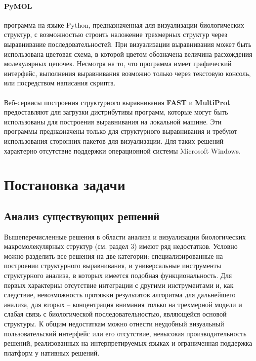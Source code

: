 \documentclass[a4paper, 12pt, titlepage, utf8]{extarticle}
\let\oldsection\section         %
\renewcommand{\section}{\newpage\oldsection}
\begin{document}
\paragraph{PyMOL \cite{pymol}}
программа на языке Python, предназначенная для визуализации биологических структур, с возможностью строить наложение трехмерных структур через выравнивание последовательностей. При визуализации выравнивания может быть использована цветовая схема, в которой цветом обозначена величина расхождения молекулярных цепочек. Несмотря на то, что программа имеет графический интерфейс, выполнения выравнивания возможно только через текстовую консоль, или посредством написания скрипта.
 
\paragraph{}
Веб-сервисы построения структурного выравнивания \textbf{FAST} и \textbf{MultiProt} предоставляют для загрузки дистрибутивы программ, которые могут быть использованы для построения выравнивания на локальной машине. Эти программы предназначены только для структурного выравнивания и требуют использования сторонних пакетов для визуализации. Для таких решений характерно отсутствие поддержки операционной системы Microsoft Windows.


\section{Постановка задачи}	%

\subsection{Анализ существующих решений}
Вышеперечисленные решения в области анализа и визуализации биологических макромолекулярных структур (см. раздел 3) имеют ряд недостатков. Условно можно разделить все решения на две категории: специализированные на построении структурного выравнивания, и универсальные инструменты структурного анализа, в которых имеется подобная функциональность. Для первых характерны отсутствие интеграции с другими инструментами и, как следствие, невозможность протяжки результатов алгоритма для дальнейшего анализа, для вторых -- концентрация внимания только на трехмерной модели и слабая связь с биологической последовательностью, являющейся основой структуры. К общим недостаткам можно отнести неудобный визуальный пользовательский интерфейс или его отсутствие, невысокая производительность решений, реализованных на интерпретируемых языках и ограниченная поддержка платформ у нативных решений.
\end{document}

